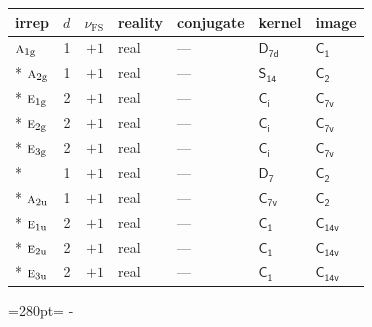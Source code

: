 \documentclass[10pt,a4paper]{article}
\newcommand{\needspace}[1]{\par\penalty-100\begingroup\dimen0=#1\relax\dimen2=\pagegoal
  \advance\dimen2-\pagetotal\ifdim\dimen0>\dimen2\relax\ifdim\dimen2>0pt\vfil\break\fi\fi
  \endgroup}
\numberwithin{equation}{section}
\newcommand{\grp}[1]{\mathsf{#1}}
\newcommand{\irr}[1]{\text{\normalfont\scshape #1}}
\newcommand{\detbox}[1]{{\setlength{\fboxsep}{1pt}\fbox{#1}}}
\newcommand{\ptag}[1]{\mathrm{#1}}
\newcommand{\fsind}{\nu_{\mathrm{FS}}}
\begin{document}
{\small\renewcommand{\arraystretch}{1.25}\begin{longtable}{@{}lrrllll@{}}\toprule
irrep & $d$ & $\fsind$ & reality & conjugate & kernel & image\\\midrule\endhead
\bottomrule\endfoot\endlastfoot
$\irr{a}_{1\ptag{g}}$ & 1 & $+1$ & real & --- & \href{D7d.pdf}{$\grp{D_{7d}}$} & \href{C1.pdf}{$\grp{C_{1}}$}\\*
$\irr{a}_{2\ptag{g}}$ & 1 & $+1$ & real & --- & \href{S14.pdf}{$\grp{S_{14}}$} & \href{C2.pdf}{$\grp{C_{2}}$}\\*
$\irr{e}_{1\ptag{g}}$ & 2 & $+1$ & real & --- & \href{S2.pdf}{$\grp{C_{i}}$} & \href{C7v.pdf}{$\grp{C_{7v}}$}\\*
$\irr{e}_{2\ptag{g}}$ & 2 & $+1$ & real & --- & \href{S2.pdf}{$\grp{C_{i}}$} & \href{C7v.pdf}{$\grp{C_{7v}}$}\\*
$\irr{e}_{3\ptag{g}}$ & 2 & $+1$ & real & --- & \href{S2.pdf}{$\grp{C_{i}}$} & \href{C7v.pdf}{$\grp{C_{7v}}$}\\*
\detbox{$\irr{a}_{1\ptag{u}}$} & 1 & $+1$ & real & --- & \href{D7.pdf}{$\grp{D_{7}}$} & \href{C2.pdf}{$\grp{C_{2}}$}\\*
$\irr{a}_{2\ptag{u}}$ & 1 & $+1$ & real & --- & \href{C7v.pdf}{$\grp{C_{7v}}$} & \href{C2.pdf}{$\grp{C_{2}}$}\\*
$\irr{e}_{1\ptag{u}}$ & 2 & $+1$ & real & --- & \href{C1.pdf}{$\grp{C_{1}}$} & $\grp{C_{14v}}$\\*
$\irr{e}_{2\ptag{u}}$ & 2 & $+1$ & real & --- & \href{C1.pdf}{$\grp{C_{1}}$} & $\grp{C_{14v}}$\\*
$\irr{e}_{3\ptag{u}}$ & 2 & $+1$ & real & --- & \href{C1.pdf}{$\grp{C_{1}}$} & $\grp{C_{14v}}$\\
\bottomrule\end{longtable}}
\needspace{280pt}
\end{document}

